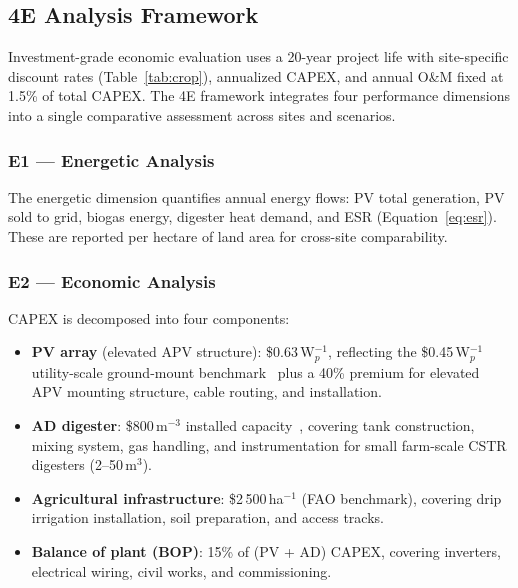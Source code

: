 \subsection{4E Analysis Framework}
\label{sec:4e}

\hspace{1cm}Investment-grade economic evaluation uses a 20-year project
life with site-specific discount rates (Table~\ref{tab:crop}), annualized
CAPEX, and annual O\&M fixed at 1.5\% of total CAPEX. The 4E framework
integrates four performance dimensions into a single comparative
assessment across sites and scenarios.

\subsubsection{E1 --- Energetic Analysis}

\hspace{1cm}The energetic dimension quantifies annual energy flows:
PV total generation, PV sold to grid, biogas energy, digester heat
demand, and ESR (Equation~\ref{eq:esr}). These are reported per
hectare of land area for cross-site comparability.

\subsubsection{E2 --- Economic Analysis}

\hspace{1cm}CAPEX is decomposed into four components:
\begin{itemize}[leftmargin=*, noitemsep]
	\item \textbf{PV array} (elevated APV structure):
	\$0.63\,W$_p^{-1}$, reflecting the \$0.45\,W$_p^{-1}$
	utility-scale ground-mount benchmark~\citep{irena2022}
	plus a 40\% premium for elevated APV mounting structure,
	cable routing, and installation.
	\item \textbf{AD digester}: \$800\,m$^{-3}$ installed
	capacity~\citep{pal2024}, covering tank construction,
	mixing system, gas handling, and instrumentation for
	small farm-scale CSTR digesters (2--50\,m$^3$).
	\item \textbf{Agricultural infrastructure}: \$2\,500\,ha$^{-1}$
	(FAO benchmark), covering drip irrigation installation,
	soil preparation, and access tracks.
	\item \textbf{Balance of plant (BOP)}: 15\% of (PV + AD) CAPEX,
	covering inverters, electrical wiring, civil works,
	and commissioning.
\end{itemize}

